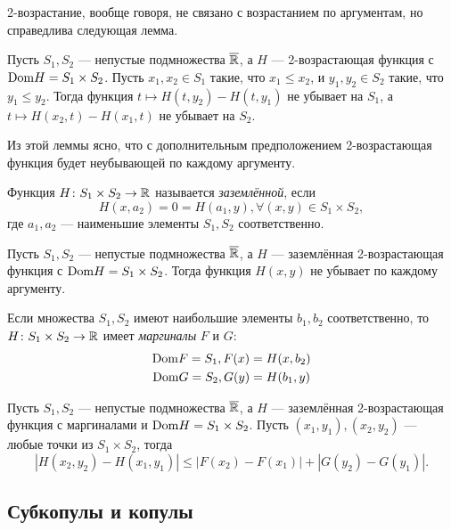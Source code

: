 2-возрастание, вообще говоря, не связано с возрастанием по аргументам, но справедлива следующая лемма.

\begin{lemma}
	Пусть $S_1, S_2$ --- непустые подмножества $\overline{\mathbb{R}}$, а $H$ --- 2-возрастающая функция с $\mathrm{Dom}{H} = S_1 \times S_2$. Пусть $x_1, x_2 \in S_1$ такие, что $x_1 \leqslant x_2$, и $y_1, y_2 \in S_2$ такие, что $y_1 \leqslant y_2$. Тогда функция $t \mapsto H(t, y_2) - H(t, y_1)$ не убывает на $S_1$, а $t \mapsto H(x_2, t) - H(x_1, t)$ не убывает на $S_2$.
\end{lemma}

Из этой леммы ясно, что с дополнительным предположением 2-возрастающая функция будет неубывающей по каждому аргументу.

\begin{define}
	Функция $H \colon S_1 \times S_2 \to \mathbb{R}$ называется \emph{заземлённой}, если
\[
H(x, a_2) = 0 = H(a_1, y), \forall (x, y) \in S_1 \times S_2,
\]
где $a_1, a_2$ --- наименьшие элементы $S_1, S_2$ соответственно.
\end{define}

\begin{lemma}
	Пусть $S_1, S_2$ --- непустые подмножества $\overline{\mathbb{R}}$, а $H$ --- заземлённая 2-возрастающая функция с $\mathrm{Dom}{H} = S_1 \times S_2$. Тогда функция $H(x, y)$ не убывает по каждому аргументу.
\end{lemma}

\begin{define}
	Если множества $S_1, S_2$ имеют наибольшие элементы $b_1, b_2$ соответственно, то $H \colon S_1 \times S_2 \to \mathbb{R}$ имеет \emph{маргиналы} $F$ и $G$:
	\begin{gather}
		\mathrm{Dom}{F} = S_1, F(x) = H(x, b_2) \\
		\mathrm{Dom}{G} = S_2, G(y) = H(b_1, y)
	\end{gather}
\end{define}

\begin{lemma}\label{lm:precont}
	Пусть $S_1, S_2$ --- непустые подмножества $\overline{\mathbb{R}}$, а $H$ --- заземлённая 2-возрастающая функция с маргиналами и $\mathrm{Dom}{H} = S_1 \times S_2$. Пусть $(x_1, y_1), (x_2, y_2)$ --- любые точки из $S_1 \times S_2$, тогда
\[
|H(x_2, y_2) - H(x_1, y_1)| \leqslant |F(x_2) - F(x_1)| + |G(y_2) - G(y_1)|.
\]
\end{lemma}

\subsection*{Субкопулы и копулы}

